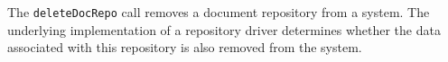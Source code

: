 The \verb+deleteDocRepo+ call removes a document repository from a \Rapture system. The underlying
implementation of a repository driver determines whether the data associated with this repository
is also removed from the system.
